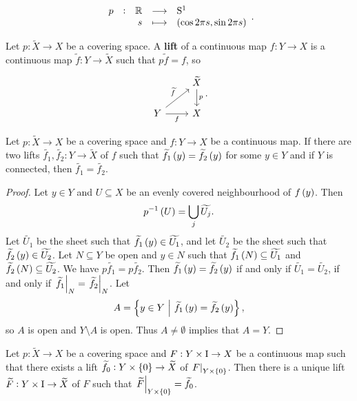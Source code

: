 \begin{example*}
$$ \function[p]{\RR}{\S^1}{s}{\br{\cos 2\pi s, \sin 2\pi s}}. $$
\end{example*}

\pagebreak

\begin{definition*}
Let $ p : \widetilde{X} \to X $ be a covering space. A \textbf{lift} of a continuous map $ f : Y \to X $ is a continuous map $ \widetilde{f} : Y \to \widetilde{X} $ such that $ p\widetilde{f} = f $, so
$$
\begin{tikzcd}
& \widetilde{X} \arrow{d}{p} \\
Y \arrow{ur}{\widetilde{f}} \arrow{r}[swap]{f} & X
\end{tikzcd}.
$$
\end{definition*}

\begin{proposition}
\label{prop:1.34}
Let $ p : \widetilde{X} \to X $ be a covering space and $ f : Y \to X $ be a continuous map. If there are two lifts $ \widetilde{f_1}, \widetilde{f_2} : Y \to \widetilde{X} $ of $ f $ such that $ \widetilde{f_1}\br{y} = \widetilde{f_2}\br{y} $ for some $ y \in Y $ and if $ Y $ is connected, then $ \widetilde{f_1} = \widetilde{f_2} $.
\end{proposition}

\begin{proof}
Let $ y \in Y $ and $ U \subseteq X $ be an evenly covered neighbourhood of $ f\br{y} $. Then
$$ p^{-1}\br{U} = \bigcup_j \widetilde{U_j}. $$
Let $ \widetilde{U_1} $ be the sheet such that $ \widetilde{f_1}\br{y} \in \widetilde{U_1} $, and let $ \widetilde{U_2} $ be the sheet such that $ \widetilde{f_2}\br{y} \in \widetilde{U_2} $. Let $ N \subseteq Y $ be open and $ y \in N $ such that $ \widetilde{f_1}\br{N} \subseteq \widetilde{U_1} $ and $ \widetilde{f_2}\br{N} \subseteq \widetilde{U_2} $. We have $ p\widetilde{f_1} = p\widetilde{f_2} $. Then $ \widetilde{f_1}\br{y} = \widetilde{f_2}\br{y} $ if and only if $ \widetilde{U_1} = \widetilde{U_2} $, if and only if $ \left. \widetilde{f_1} \right|_N = \left. \widetilde{f_2} \right|_N $. Let
$$ A = \cbr{y \in Y \st \widetilde{f_1}\br{y} = \widetilde{f_2}\br{y}}, $$
so $ A $ is open and $ Y \setminus A $ is open. Thus $ A \ne \emptyset $ implies that $ A = Y $.
\end{proof}

\begin{proposition}
\label{prop:1.30}
Let $ p : \widetilde{X} \to X $ be a covering space and $ F : Y \times \mathrm{I} \to X $ be a continuous map such that there exists a lift $ \widetilde{f_0} : Y \times \cbr{0} \to \widetilde{X} $ of $ \eval{F}_{Y \times \cbr{0}} $. Then there is a unique lift $ \widetilde{F} : Y \times \mathrm{I} \to \widetilde{X} $ of $ F $ such that $ \eval{\widetilde{F}}_{Y \times \cbr{0}} = \widetilde{f_0} $.
\end{proposition}


